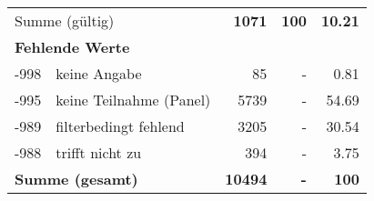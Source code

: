 \begin{longtable}{lXrrr}
     \midrule
     \multicolumn{2}{l}{Summe (gültig)} &
       \textbf{\num{1071}} &
     \textbf{\num{100}} &
       \textbf{\num[round-mode=places,round-precision=2]{10.21}} \\
     \multicolumn{5}{l}{\textbf{Fehlende Werte}}\\
       -998 &
       keine Angabe &
         \num{85} &
        - &
         \num[round-mode=places,round-precision=2]{0.81} \\
       -995 &
       keine Teilnahme (Panel) &
         \num{5739} &
        - &
         \num[round-mode=places,round-precision=2]{54.69} \\
       -989 &
       filterbedingt fehlend &
         \num{3205} &
        - &
         \num[round-mode=places,round-precision=2]{30.54} \\
       -988 &
       trifft nicht zu &
         \num{394} &
        - &
         \num[round-mode=places,round-precision=2]{3.75} \\
     \midrule
     \multicolumn{2}{l}{\textbf{Summe (gesamt)}} &
          \textbf{\num{10494}} &
        \textbf{-} &
        \textbf{\num{100}} \\
     \bottomrule
     \end{longtable}
     
